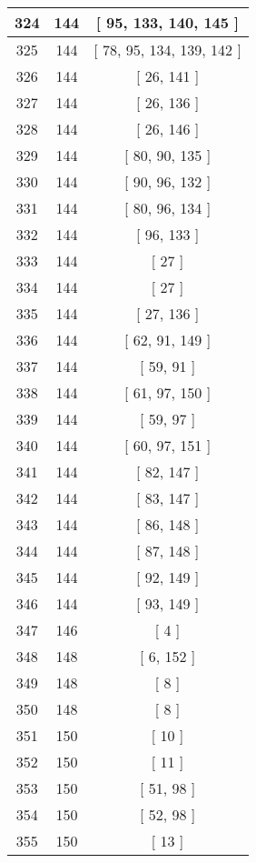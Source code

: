 \begin{center}
\begin{longtable}[H]{|| c c c ||}
\hline
324 & 144 & [ 95, 133, 140, 145 ] \\ 
\hline
325 & 144 & [ 78, 95, 134, 139, 142 ] \\ 
\hline
326 & 144 & [ 26, 141 ] \\ 
\hline
327 & 144 & [ 26, 136 ] \\ 
\hline
328 & 144 & [ 26, 146 ] \\ 
\hline
329 & 144 & [ 80, 90, 135 ] \\ 
\hline
330 & 144 & [ 90, 96, 132 ] \\ 
\hline
331 & 144 & [ 80, 96, 134 ] \\ 
\hline
332 & 144 & [ 96, 133 ] \\ 
\hline
333 & 144 & [ 27 ] \\ 
\hline
334 & 144 & [ 27 ] \\ 
\hline
335 & 144 & [ 27, 136 ] \\ 
\hline
336 & 144 & [ 62, 91, 149 ] \\ 
\hline
337 & 144 & [ 59, 91 ] \\ 
\hline
338 & 144 & [ 61, 97, 150 ] \\ 
\hline
339 & 144 & [ 59, 97 ] \\ 
\hline
340 & 144 & [ 60, 97, 151 ] \\ 
\hline
341 & 144 & [ 82, 147 ] \\ 
\hline
342 & 144 & [ 83, 147 ] \\ 
\hline
343 & 144 & [ 86, 148 ] \\ 
\hline
344 & 144 & [ 87, 148 ] \\ 
\hline
345 & 144 & [ 92, 149 ] \\ 
\hline
346 & 144 & [ 93, 149 ] \\ 
\hline
347 & 146 & [ 4 ] \\ 
\hline
348 & 148 & [ 6, 152 ] \\ 
\hline
349 & 148 & [ 8 ] \\ 
\hline
350 & 148 & [ 8 ] \\ 
\hline
351 & 150 & [ 10 ] \\ 
\hline
352 & 150 & [ 11 ] \\ 
\hline
353 & 150 & [ 51, 98 ] \\ 
\hline
354 & 150 & [ 52, 98 ] \\ 
\hline
355 & 150 & [ 13 ] \\ 
\hline
\end{longtable}
\end{center}

